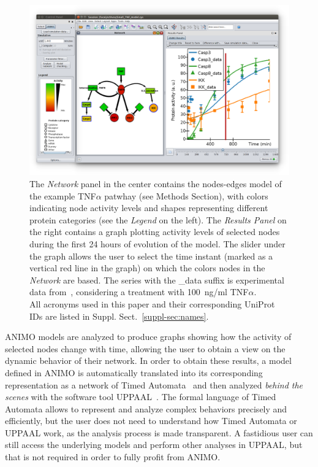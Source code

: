\documentclass{bmcart}
\begin{document}
\begin{figure}[htbp]
\begin{center}
   \includegraphics[width=.85\textwidth]{images/screenshotTNFmodelSmall}
\end{center}
\caption{
The \emph{Network} panel in the center contains the nodes-edges
model of the example TNF$\alpha$ patwhay (see Methods Section), with
colors indicating node activity levels and shapes representing different protein categories (see the \emph{Legend} on the left).
The \emph{Results Panel} on the right contains a graph plotting activity levels of selected nodes
during the first 24 hours of evolution of the model. The slider under the graph
allows the user to select the time instant (marked as a vertical red line in the graph) on which
the colors nodes in the \emph{Network} are based.
The series with the {\sf \_data} suffix is experimental
data from~\cite{pathway-compendium}, considering a treatment with 100~ng/ml TNF$\alpha$.\\
All acronyms used in this paper
and their corresponding UniProt IDs are listed in Suppl. Sect.~\ref{suppl-sec:names}.
\label{fig:cytoscape}}
\end{figure}


ANIMO models are analyzed to produce graphs showing how the activity of selected nodes
change with time, allowing the user to obtain a view on the dynamic behavior of their network.
In order to obtain these results, a model defined in ANIMO is automatically translated into
its corresponding representation as a network of Timed Automata~\cite{timed-automata-alur-dill}
and then analyzed \emph{behind the scenes} with the software tool UPPAAL~\cite{uppaal}.
The formal language of Timed Automata allows to represent and analyze complex behaviors precisely and efficiently,
but the user does not need to understand how Timed Automata or UPPAAL work, as the analysis process is made transparent.
A fastidious user can still access the underlying models and perform other analyses in UPPAAL,
but that is not required in order to fully profit from ANIMO.
\end{document}
